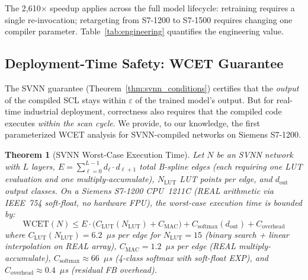 \documentclass[journal,onecolumn]{IEEEtran}
\newtheorem{theorem}{Theorem}
\begin{document}
The 2,610$\times$ speedup applies across the full model lifecycle: retraining
requires a single re-invocation; retargeting from S7-1200 to S7-1500 requires
changing one compiler parameter. Table~\ref{tab:engineering} quantifies the
engineering value.

\subsection{Deployment-Time Safety: WCET Guarantee}
\label{sec:wcet}

The SVNN guarantee (Theorem~\ref{thm:svnn_conditions}) certifies
that the \textit{output} of the compiled SCL stays within
$\varepsilon$ of the trained model's output. But for real-time industrial
deployment, correctness also requires that the compiled code executes
\textit{within the scan cycle}. We provide, to our knowledge, the first parameterized WCET
analysis for SVNN-compiled networks on Siemens S7-1200.

\vspace{4pt}
\setcounter{theorem}{10}
\begin{theorem}[SVNN Worst-Case Execution Time]
\label{thm:wcet}
Let $N$ be an SVNN network with $L$ layers, $E = \sum_{\ell=0}^{L-1}
d_\ell \cdot d_{\ell+1}$ total B-spline edges (each requiring one LUT
evaluation and one multiply-accumulate), $N_{\text{LUT}}$ LUT points
per edge, and $d_{\text{out}}$ output classes.
On a Siemens S7-1200 CPU~1211C (REAL arithmetic via IEEE~754 soft-float,
no hardware FPU), the worst-case execution time is bounded by:
\begin{equation}
\text{WCET}(N) \leq E \cdot \bigl(C_{\text{LUT}}(N_{\text{LUT}})
+ C_{\text{MAC}}\bigr) + C_{\text{softmax}}(d_{\text{out}})
+ C_{\text{overhead}}
\label{eq:wcet_general}
\end{equation}
where $C_{\text{LUT}}(N_{\text{LUT}}) = 6.2$~$\mu$s per edge for
$N_{\text{LUT}}=15$ (binary search + linear interpolation on REAL array),
$C_{\text{MAC}} = 1.2$~$\mu$s per edge (REAL multiply-accumulate),
$C_{\text{softmax}} \approx 66$~$\mu$s (4-class softmax with soft-float EXP),
and $C_{\text{overhead}} \approx 0.4$~$\mu$s (residual FB overhead).
\end{theorem}
\end{document}
